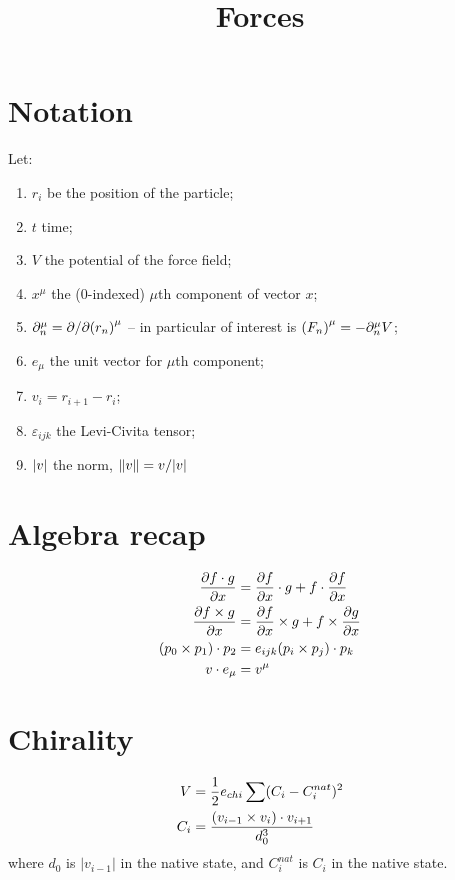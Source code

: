 \documentclass{article}
\title{Forces}
\author{}
\date{}
\DeclarePairedDelimiter{\brk}{(}{)}
\DeclarePairedDelimiter{\norm}{\lvert}{\rvert}
\DeclarePairedDelimiter{\normed}{\lVert}{\rVert}
\newcommand{\cross}{\times}
\begin{document}
  \maketitle

  \section*{Notation}
  Let:
  \begin{enumerate}
    \item $r_i$ be the position of the particle;
    \item $t$ time;
    \item $V$ the potential of the force field;
    \item $x^\mu$ the (0-indexed) $\mu$th component of vector $x$;
    \item $\partial_n^\mu = \partial/\partial \brk*{r_n}^\mu$ -- in particular of interest is $\brk*{F_n}^\mu = -\partial_n^\mu V$;
    \item $e_\mu$ the unit vector for $\mu$th component;
    \item $v_i = r_{i+1}-r_i$;
    \item $\varepsilon_{ijk}$ the Levi-Civita tensor;
    \item $\norm{v}$ the norm, $\normed{v} = v/\norm{v}$
  \end{enumerate}

  \section*{Algebra recap}
  \begin{align*}
    \frac{\partial f \cdot g}{\partial x} &= \frac{\partial f}{\partial x} \cdot g + f \cdot \frac{\partial f}{\partial x}\\
    \frac{\partial f \cross g}{\partial x} &= \frac{\partial f}{\partial x} \cross g + f \cross \frac{\partial g}{\partial x}\\
    \brk*{p_0 \cross p_1} \cdot p_2 &= e_{ijk} \brk*{p_i \cross p_j} \cdot p_k\\
    v \cdot e_\mu &= v^\mu
  \end{align*}

  \section*{Chirality}
  \begin{align*}
    V &= \frac{1}{2} e_{chi} \sum (C_i - C_i^{nat})^2\\
    C_i &= \frac{\brk*{v_{i-1} \cross v_i} \cdot v_{i+1}}{d_0^3}
  \end{align*}
  where $d_0$ is $|v_{i-1}|$ in the native state, and $C_i^{nat}$ is $C_i$ in the native state.
\end{document}

